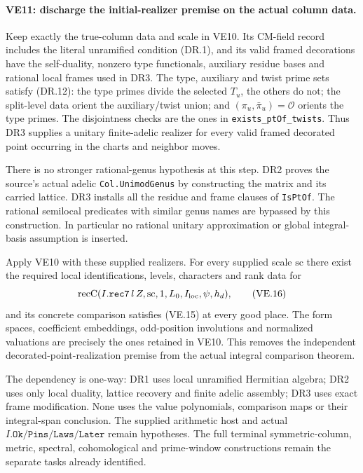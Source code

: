 \paragraph{VE11: discharge the initial-realizer premise on the actual column data.}
Keep exactly the true-column data and scale in VE10. Its CM-field
record includes the literal unramified condition (DR.1), and its
valid framed decorations have the self-duality, nonzero type
functionals, auxiliary residue bases and rational local frames used
in DR3. The type, auxiliary and twist prime sets satisfy (DR.12):
the type primes divide the selected $T_u$, the others do not;
the split-level data orient the auxiliary/twist union; and
$(\pi_u,\bar\pi_u)=\mathcal O$ orients the type primes.
The disjointness checks are the ones in
\texttt{exists\_ptOf\_twists}. Thus DR3 supplies a unitary finite-adelic
realizer for every valid framed decorated point occurring in the
charts and neighbor moves.

There is no stronger rational-genus hypothesis at this step.
DR2 proves the source's actual adelic \texttt{Col.UnimodGenus}
by constructing the matrix and its carried lattice. DR3 installs
all the residue and frame clauses of \texttt{IsPtOf}. The rational
semilocal predicates with similar genus names are bypassed by this
construction. In particular no rational unitary approximation or
global integral-basis assumption is inserted.

Apply VE10 with these supplied realizers. For every supplied scale
$\mathrm{sc}$ there exist the required local identifications, levels,
characters and rank data for
\[
 \operatorname{recC}(I.\texttt{rec7}\,l\,Z,
                  \mathrm{sc},1,L_0,I_{\rm loc},\psi,h_d),
                                                        \tag{VE.16}
\]
and its concrete comparison satisfies (VE.15) at every good place.
The form spaces, coefficient embeddings, odd-position involutions
and normalized valuations are precisely the ones retained in VE10.
This removes the independent decorated-point-realization premise
from the actual integral comparison theorem.

The dependency is one-way: DR1 uses local unramified Hermitian algebra;
DR2 uses only local duality, lattice recovery and finite adelic assembly;
DR3 uses exact frame modification. None uses the value polynomials,
comparison maps or their integral-span conclusion. The supplied
arithmetic host and actual $I.\texttt{Ok}/\texttt{Pins}/
\texttt{Laws}/\texttt{Later}$ remain hypotheses. The full terminal
symmetric-column, metric, spectral, cohomological and prime-window
constructions remain the separate tasks already identified.
